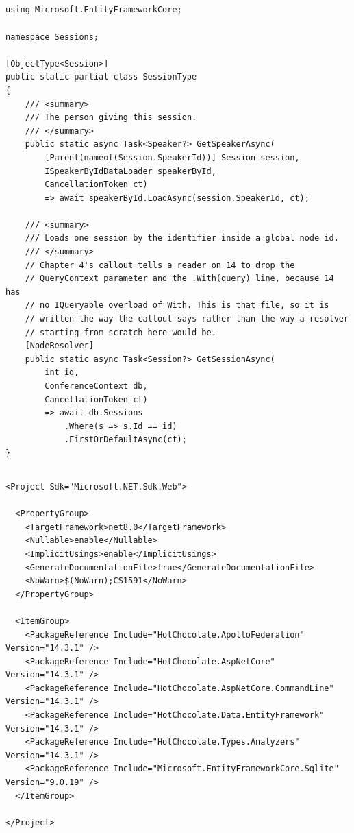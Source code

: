 \subsection*{}
\begin{verbatim}
using Microsoft.EntityFrameworkCore;

namespace Sessions;

[ObjectType<Session>]
public static partial class SessionType
{
    /// <summary>
    /// The person giving this session.
    /// </summary>
    public static async Task<Speaker?> GetSpeakerAsync(
        [Parent(nameof(Session.SpeakerId))] Session session,
        ISpeakerByIdDataLoader speakerById,
        CancellationToken ct)
        => await speakerById.LoadAsync(session.SpeakerId, ct);

    /// <summary>
    /// Loads one session by the identifier inside a global node id.
    /// </summary>
    // Chapter 4's callout tells a reader on 14 to drop the
    // QueryContext parameter and the .With(query) line, because 14 has
    // no IQueryable overload of With. This is that file, so it is
    // written the way the callout says rather than the way a resolver
    // starting from scratch here would be.
    [NodeResolver]
    public static async Task<Session?> GetSessionAsync(
        int id,
        ConferenceContext db,
        CancellationToken ct)
        => await db.Sessions
            .Where(s => s.Id == id)
            .FirstOrDefaultAsync(ct);
}
\end{verbatim}

\subsection*{}
\begin{verbatim}
<Project Sdk="Microsoft.NET.Sdk.Web">

  <PropertyGroup>
    <TargetFramework>net8.0</TargetFramework>
    <Nullable>enable</Nullable>
    <ImplicitUsings>enable</ImplicitUsings>
    <GenerateDocumentationFile>true</GenerateDocumentationFile>
    <NoWarn>$(NoWarn);CS1591</NoWarn>
  </PropertyGroup>

  <ItemGroup>
    <PackageReference Include="HotChocolate.ApolloFederation" Version="14.3.1" />
    <PackageReference Include="HotChocolate.AspNetCore" Version="14.3.1" />
    <PackageReference Include="HotChocolate.AspNetCore.CommandLine" Version="14.3.1" />
    <PackageReference Include="HotChocolate.Data.EntityFramework" Version="14.3.1" />
    <PackageReference Include="HotChocolate.Types.Analyzers" Version="14.3.1" />
    <PackageReference Include="Microsoft.EntityFrameworkCore.Sqlite" Version="9.0.19" />
  </ItemGroup>

</Project>
\end{verbatim}

